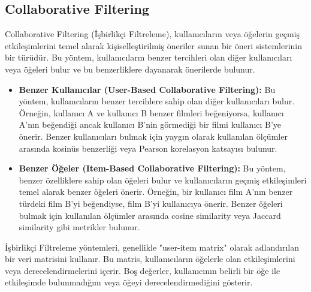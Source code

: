 \subsection{Collaborative Filtering}
Collaborative Filtering (İşbirlikçi Filtreleme), kullanıcıların veya öğelerin geçmiş etkileşimlerini temel alarak kişiselleştirilmiş öneriler sunan bir öneri sistemlerinin bir türüdür. Bu yöntem, kullanıcıların benzer tercihleri olan diğer kullanıcıları veya öğeleri bulur ve bu benzerliklere dayanarak önerilerde bulunur.

\begin{itemize}
    \item \textbf{Benzer Kullanıcılar (User-Based Collaborative Filtering):} Bu yöntem, kullanıcıların benzer tercihlere sahip olan diğer kullanıcıları bulur. Örneğin, kullanıcı A ve kullanıcı B benzer filmleri beğeniyorsa, kullanıcı A'nın beğendiği ancak kullanıcı B'nin görmediği bir filmi kullanıcı B'ye önerir. Benzer kullanıcıları bulmak için yaygın olarak kullanılan ölçümler arasında kosinüs benzerliği veya Pearson korelasyon katsayısı bulunur.
    \item \textbf{Benzer Öğeler (Item-Based Collaborative Filtering):} Bu yöntem, benzer özelliklere sahip olan öğeleri bulur ve kullanıcıların geçmiş etkileşimleri temel alarak benzer öğeleri önerir. Örneğin, bir kullanıcı film A'nın benzer türdeki film B'yi beğendiyse, film B'yi kullanıcıya önerir. Benzer öğeleri bulmak için kullanılan ölçümler arasında cosine similarity veya Jaccard similarity gibi metrikler bulunur.
\end{itemize}

İşbirlikçi Filtreleme yöntemleri, genellikle "user-item matrix" olarak adlandırılan bir veri matrisini kullanır. Bu matris, kullanıcıların öğelerle olan etkileşimlerini veya derecelendirmelerini içerir. Boş değerler, kullanıcının belirli bir öğe ile etkileşimde bulunmadığını veya öğeyi derecelendirmediğini gösterir.

\newpage